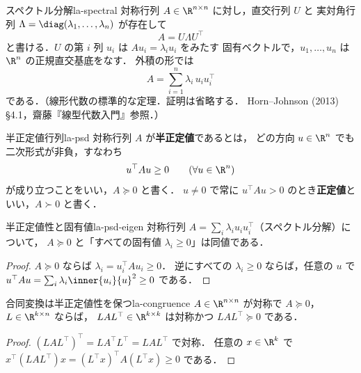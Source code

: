 \begin{theorem}{スペクトル分解}{la-spectral}
  対称行列 $A\in\R^{n\times n}$ に対し，直交行列 $U$ と
  実対角行列 $\Lambda=\diag(\lambda_1,\dots,\lambda_n)$ が存在して
  \[
    A=U\Lambda U^\top
  \]
  と書ける．$U$ の第 $i$ 列 $u_i$ は $Au_i=\lambda_iu_i$ をみたす
  固有ベクトルで，$u_1,\dots,u_n$ は $\R^n$ の正規直交基底をなす．
  外積の形では
  \[
    A=\sum_{i=1}^n\lambda_i\,u_iu_i^\top
  \]
  である．（線形代数の標準的な定理．証明は省略する．
  Horn--Johnson (2013) \S4.1，齋藤『線型代数入門』参照．）
\end{theorem}

\begin{definition}{半正定値行列}{la-psd}
  対称行列 $A$ が\textbf{半正定値}であるとは，
  どの方向 $u\in\R^n$ でも二次形式が非負，すなわち
  \[
    u^\top Au\geq0\qquad(\forall u\in\R^n)
  \]
  が成り立つことをいい，$A\succeq0$ と書く．
  $u\neq0$ で常に $u^\top Au>0$ のとき\textbf{正定値}といい，$A\succ0$ と書く．
\end{definition}

\begin{claim}{半正定値性と固有値}{la-psd-eigen}
  対称行列 $A=\sum_i\lambda_iu_iu_i^\top$（スペクトル分解）について，
  $A\succeq0$ と「すべての固有値 $\lambda_i\geq0$」は同値である．
\end{claim}

\begin{proof}
  $A\succeq0$ ならば $\lambda_i=u_i^\top Au_i\geq0$．
  逆にすべての $\lambda_i\geq0$ ならば，任意の $u$ で
  $u^\top Au=\sum_i\lambda_i\inner{u_i}{u}^2\geq0$ である．
\end{proof}

\begin{claim}{合同変換は半正定値性を保つ}{la-congruence}
  $A\in\R^{n\times n}$ が対称で $A\succeq0$，$L\in\R^{k\times n}$ ならば，
  $LAL^\top\in\R^{k\times k}$ は対称かつ $LAL^\top\succeq0$ である．
\end{claim}

\begin{proof}
  $(LAL^\top)^\top=LA^\top L^\top=LAL^\top$ で対称．
  任意の $x\in\R^k$ で
  $x^\top(LAL^\top)x=(L^\top x)^\top A(L^\top x)\geq0$ である．
\end{proof}

